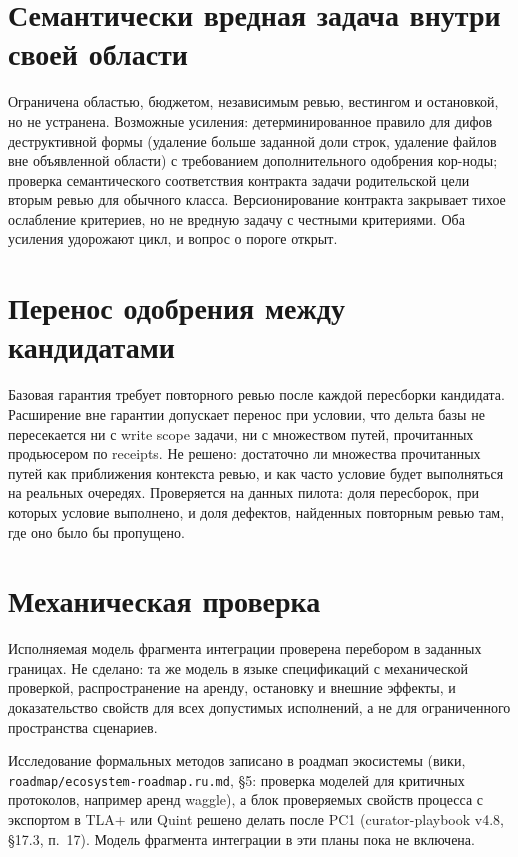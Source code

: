 \section{Семантически вредная задача внутри своей области}

Ограничена областью, бюджетом, независимым ревью, вестингом и остановкой, но не устранена. Возможные усиления: детерминированное правило для дифов деструктивной формы (удаление больше заданной доли строк, удаление файлов вне объявленной области) с требованием дополнительного одобрения кор-ноды; проверка семантического соответствия контракта задачи родительской цели вторым ревью для обычного класса. Версионирование контракта закрывает тихое ослабление критериев, но не вредную задачу с честными критериями. Оба усиления удорожают цикл, и вопрос о пороге открыт.

\section{Перенос одобрения между кандидатами}

Базовая гарантия требует повторного ревью после каждой пересборки кандидата. Расширение вне гарантии допускает перенос при условии, что дельта базы не пересекается ни с write scope задачи, ни с множеством путей, прочитанных продьюсером по receipts. Не решено: достаточно ли множества прочитанных путей как приближения контекста ревью, и как часто условие будет выполняться на реальных очередях. Проверяется на данных пилота: доля пересборок, при которых условие выполнено, и доля дефектов, найденных повторным ревью там, где оно было бы пропущено.

\section{Механическая проверка}

Исполняемая модель фрагмента интеграции проверена перебором в заданных границах. Не сделано: та же модель в языке спецификаций с механической проверкой, распространение на аренду, остановку и внешние эффекты, и доказательство свойств для всех допустимых исполнений, а не для ограниченного пространства сценариев.

 Исследование формальных методов записано в роадмап экосистемы (вики, \texttt{roadmap/ecosystem-roadmap.ru.md}, §5: проверка моделей для критичных протоколов, например аренд waggle), а блок проверяемых свойств процесса с экспортом в TLA+ или Quint решено делать после PC1 (curator-playbook v4.8, §17.3, п.~17). Модель фрагмента интеграции в эти планы пока не включена.

